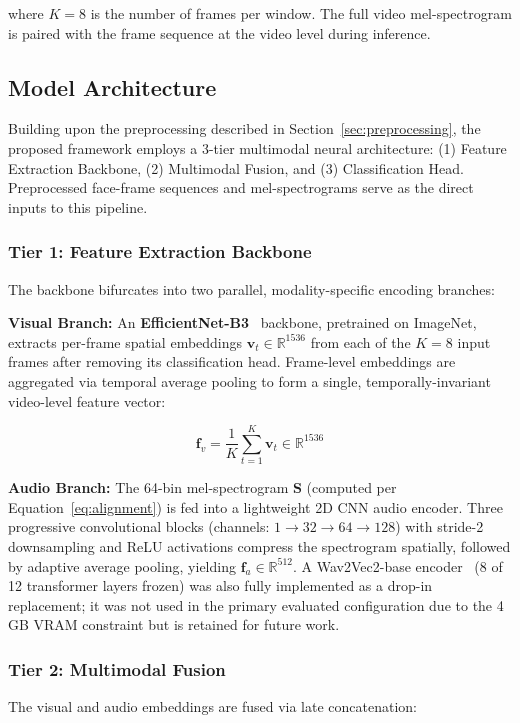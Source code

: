 \documentclass[conference]{IEEEtran}
\begin{document}
where $K = 8$ is the number of frames per window. The full video mel-spectrogram 
is paired with the frame sequence at the video level during inference.

\subsection{Model Architecture}
\label{sec:architecture}

Building upon the preprocessing described in Section~\ref{sec:preprocessing}, the proposed framework employs a 3-tier multimodal neural architecture: (1) Feature Extraction Backbone, (2) Multimodal Fusion, and (3) Classification Head. Preprocessed face-frame sequences and mel-spectrograms serve as the direct inputs to this pipeline.

\subsubsection{Tier 1: Feature Extraction Backbone}
The backbone bifurcates into two parallel, modality-specific encoding branches:

\textbf{Visual Branch:} An \textbf{EfficientNet-B3}~\cite{tan2019efficientnet} backbone, pretrained on ImageNet, extracts per-frame spatial embeddings $\mathbf{v}_t \in \mathbb{R}^{1536}$ from each of the $K=8$ input frames after removing its classification head. Frame-level embeddings are aggregated via temporal average pooling to form a single, temporally-invariant video-level feature vector:

\begin{equation}
  \mathbf{f}_v = \frac{1}{K} \sum_{t=1}^{K} \mathbf{v}_t \in \mathbb{R}^{1536}
  \label{eq:temporal_pool}
\end{equation}

\textbf{Audio Branch:} The 64-bin mel-spectrogram $\mathbf{S}$ (computed per Equation~\ref{eq:alignment}) is fed into a lightweight 2D CNN audio encoder. Three progressive convolutional blocks (channels: $1 \to 32 \to 64 \to 128$) with stride-2 downsampling and ReLU activations compress the spectrogram spatially, followed by adaptive average pooling, yielding $\mathbf{f}_a \in \mathbb{R}^{512}$. A Wav2Vec2-base encoder~\cite{baevski2020wav2vec2} (8 of 12 transformer layers frozen) was also fully implemented as a drop-in replacement; it was not used in the primary evaluated configuration due to the 4\,GB VRAM constraint but is retained for future work.

\subsubsection{Tier 2: Multimodal Fusion}
The visual and audio embeddings are fused via late concatenation:
\end{document}
